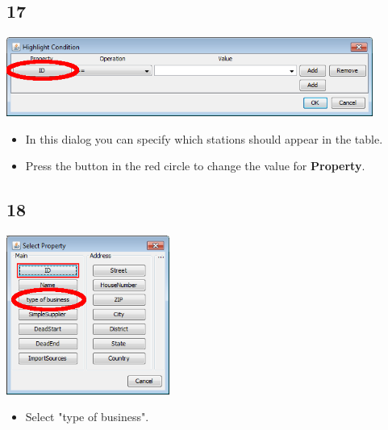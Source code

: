 \documentclass{beamer}
\begin{document}
\subsection{17}
\begin{frame}
	\begin{center}
  		\includegraphics[width=0.9\textwidth]{17.png}
	\end{center}
	\begin{itemize}
		\item In this dialog you can specify which stations should appear in the table.
		\item Press the button in the red circle to change the value for \textbf{Property}.
	\end{itemize}
\end{frame}

\subsection{18}
\begin{frame}
	\begin{center}
  		\includegraphics[width=0.4\textwidth]{18.png}
	\end{center}
	\begin{itemize}
		\item Select "type of business".	
	\end{itemize}
\end{frame}
\end{document}
